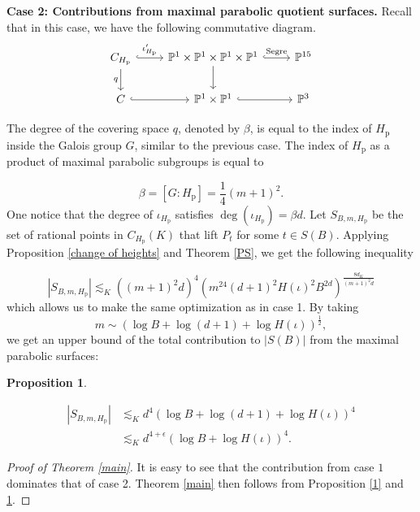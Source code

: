 \documentclass[12pt]{amsart}
\newtheorem{prop}[thm]{Proposition}
\theoremstyle{definition}
\theoremstyle{remark}
\numberwithin{equation}{section}
\renewcommand{\P}{\mathbb{P}}
\begin{document}
\vspace{2em}	
\noindent \textbf{Case 2: Contributions from maximal parabolic quotient surfaces. }
Recall that in this case, we have the following commutative diagram.
$$\begin{tikzcd}
   C_{H_{\operatorname{p}}}  \arrow[r, hook, "\iota^{\prime}_{{H}_{\operatorname{p}}}"] \arrow[d, "q", swap]  & \P^{1} \times \P^{1} \times \P^{1} \times \P^{1}  \arrow[r, hook, "\text{Segre}"] \arrow[d] & \P^{15}   \\
C  \arrow[r, hook] & \P^{1} \times \P^{1} \arrow[r, hook] & \P^{3} 	
\end{tikzcd}$$

The degree of the covering space $q$, denoted by $\beta$, is equal to the index of $H_{\operatorname{p}}$ inside the Galois group $G$, similar to the previous case. The index of $H_{\operatorname{p}}$ as a product of maximal parabolic subgroups is equal to 

$$\beta = [G:H_{\operatorname{p}}] = \frac{1}{4}(m+1)^{2}.$$
One notice that the degree of $\iota_{H_{\operatorname{p}}}$ satisfies $\operatorname{deg}(\iota_{{H}_{\operatorname{p}}})=\beta d$. Let $S_{B, m, H_{\operatorname{p}}}$ be the set of rational points in $C_{H_{\operatorname{p}}}(K)$ that lift $P_{t}$ for some $t \in S(B)$. Applying Proposition \ref{change of heights} and Theorem \ref{PS}, we get the following inequality

$$|S_{B, m, H_{\operatorname{p}}}| \lesssim_{K} ((m+1)^{2}d)^{4}(m^{24}(d+1)^{2}H(\iota)^{2}B^{2d})^{\frac{8d_{K}}{(m+1)^{2}d}}$$
which allows us to make the same optimization as in case 1. By taking $$m \sim (\log B + \log (d+1) + \log H(\iota))^{\frac{1}{2}},$$ we get an upper bound of the total contribution to $\vert   S(B)\vert $ from the maximal parabolic surfaces: 

\begin{prop}\label{2}

	\begin{align*}
		|S_{B, m, H_{\operatorname{p}}}| &\lesssim_{K} d^{4}(\log B + \log (d+1) + \log H(\iota))^{4} \\
&\lesssim_{K} d^{4+\epsilon}(\log B  + \log H(\iota))^{4}.
	\end{align*}
	
	
\end{prop}

 \begin{proof}[Proof of Theorem \ref{main}]
 
 It is easy to see that the contribution from case $1$ dominates that of case 2. Theorem \ref{main} then follows from Proposition \ref{1} and \ref{2}.

	
 \end{proof}
	
\end{document}
